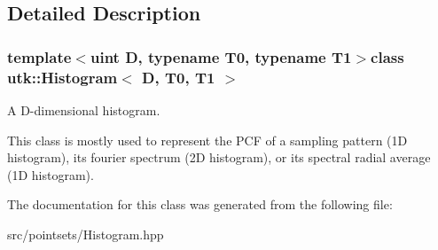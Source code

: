 \subsection{Detailed Description}
\subsubsection*{template$<$uint D, typename T0, typename T1$>$class utk\-::\-Histogram$<$ D, T0, T1 $>$}

A D-\/dimensional histogram. 

This class is mostly used to represent the P\-C\-F of a sampling pattern (1\-D histogram), its fourier spectrum (2\-D histogram), or its spectral radial average (1\-D histogram). 

The documentation for this class was generated from the following file\-:\begin{DoxyCompactItemize}
\item 
src/pointsets/Histogram.\-hpp\end{DoxyCompactItemize}
